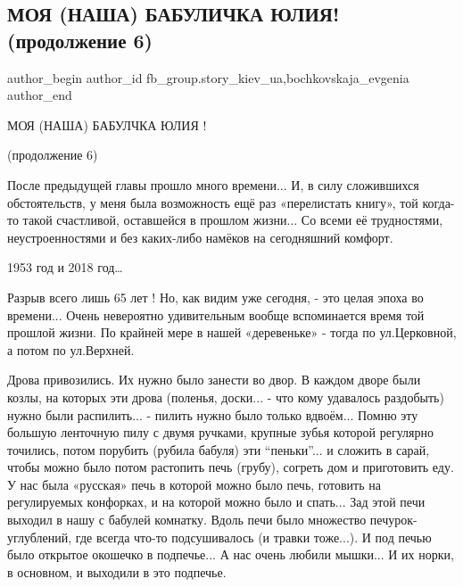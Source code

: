  
 
 
 
 
 
\subsection{МОЯ  (НАША) БАБУЛИЧКА ЮЛИЯ! (продолжение 6)}
\label{sec:31_03_2018.fb.fb_group.story_kiev_ua.1.babulichka_julia_6}
 
\ifcmt
 author_begin
   author_id fb_group.story_kiev_ua,bochkovskaja_evgenia
 author_end
\fi

МОЯ (НАША) БАБУЛЧКА ЮЛИЯ !

(продолжение 6)

После предыдущей главы прошло много времени... И, в силу сложившихся
обстоятельств, у меня была возможность ещё раз «перелистать книгу», той
когда-то такой счастливой, оставшейся в прошлом жизни... Со всеми её трудностями,
неустроенностями и без каких-либо намёков на сегодняшний комфорт. 

1953 год и 2018 год… 

Разрыв всего лишь 65 лет ! Но, как видим уже сегодня, - это целая эпоха во
времени... Очень невероятно удивительным вообще вспоминается время той прошлой
жизни. По крайней мере в нашей «деревеньке» - тогда по ул.Церковной, а потом
по  ул.Верхней. 

Дрова привозились. Их нужно было занести во двор. В каждом дворе были козлы, на
которых эти дрова (поленья, доски... - что кому удавалось раздобыть) нужно были
распилить... - пилить нужно было только вдвоём... Помню эту большую ленточную
пилу с двумя ручками, крупные зубья которой регулярно точились, потом порубить
(рубила бабуля) эти \enquote{пеньки}... и сложить в сарай, чтобы можно было потом
растопить печь (грубу), согреть дом и приготовить еду. У нас была «русская»
печь в которой можно было печь, готовить на регулируемых конфорках, и на
которой можно было и спать... Зад этой печи выходил в нашу с бабулей комнатку.
Вдоль печи было множество печурок-углублений, где всегда что-то подсушивалось
(и травки тоже...). И под печью было открытое окошечко в подпечье... А нас очень
любили мышки... И их норки, в основном, и выходили в это подпечье.

